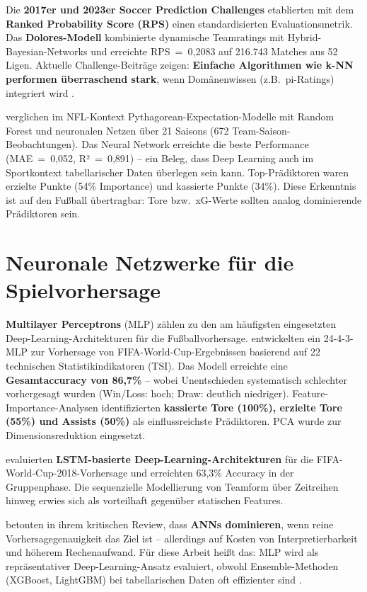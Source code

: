 Die \textbf{2017er und 2023er Soccer Prediction Challenges} \cite{Constantinou2018,YeungEtAl2024} etablierten mit dem \textbf{Ranked Probability Score (RPS)} einen standardisierten Evaluationsmetrik. Das \textbf{Dolores-Modell} \cite{Constantinou2018} kombinierte dynamische Teamratings mit Hybrid-Bayesian-Networks und erreichte RPS~=~0,2083 auf 216.743 Matches aus 52 Ligen. Aktuelle Challenge-Beiträge zeigen: \textbf{Einfache Algorithmen wie k-NN performen überraschend stark}, wenn Domänenwissen (z.B.\ pi-Ratings) integriert wird \cite{YeungEtAl2024}.

\textcite{WeirichEtAl2025} verglichen im NFL-Kontext Pythagorean-Expectation-Modelle mit Random Forest und neuronalen Netzen über 21 Saisons (672 Team-Saison-Beobachtungen). Das Neural Network erreichte die beste Performance (MAE~=~0,052, R²~=~0,891) -- ein Beleg, dass Deep Learning auch im Sportkontext tabellarischer Daten überlegen sein kann. Top-Prädiktoren waren erzielte Punkte (54\% Importance) und kassierte Punkte (34\%). Diese Erkenntnis ist auf den Fußball übertragbar: Tore bzw.\ xG-Werte sollten analog dominierende Prädiktoren sein.

\section{Neuronale Netzwerke für die Spielvorhersage}
\label{sec:neuronale-netze}

\textbf{Multilayer Perceptrons} (MLP) zählen zu den am häufigsten eingesetzten Deep-Learning-Architekturen für die Fußballvorhersage. \textcite{LuoEtAl2025} entwickelten ein 24-4-3-MLP zur Vorhersage von FIFA-World-Cup-Ergebnissen basierend auf 22 technischen Statistikindikatoren (TSI). Das Modell erreichte eine \textbf{Gesamtaccuracy von 86,7\%} -- wobei Unentschieden systematisch schlechter vorhergesagt wurden (Win/Loss: hoch; Draw: deutlich niedriger). Feature-Importance-Analysen identifizierten \textbf{kassierte Tore (100\%), erzielte Tore (55\%) und Assists (50\%)} als einflussreichste Prädiktoren. PCA wurde zur Dimensionsreduktion eingesetzt.

\textcite{Rahman2019} evaluierten \textbf{LSTM-basierte Deep-Learning-Architekturen} für die FIFA-World-Cup-2018-Vorhersage und erreichten 63,3\% Accuracy in der Gruppenphase. Die sequenzielle Modellierung von Teamform über Zeitreihen hinweg erwies sich als vorteilhaft gegenüber statischen Features.

\textcite{Bunker2017} betonten in ihrem kritischen Review, dass \textbf{ANNs dominieren}, wenn reine Vorhersagegenauigkeit das Ziel ist -- allerdings auf Kosten von Interpretierbarkeit und höherem Rechenaufwand. Für diese Arbeit heißt das: MLP wird als repräsentativer Deep-Learning-Ansatz evaluiert, obwohl Ensemble-Methoden (XGBoost, LightGBM) bei tabellarischen Daten oft effizienter sind \cite{Shwartz-ZivAramon2020}.

